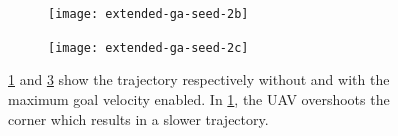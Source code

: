\begin{figure}
	\centering
	\begin{subfigure}[t]{0.30\columnwidth}
        		\texttt{[image: extended-ga-seed-2b]}
        		\caption{}
        		 \label{fig:ga-seed-nomaxvelb}
	\end{subfigure}	
	\hfill
	\begin{subfigure}[t]{0.30\columnwidth}
        		\texttt{[image: extended-ga-seed-2c]}
        		\caption{}
        		 \label{fig:ga-seed-maxvel}
	\end{subfigure}		
	\caption{ \ref{fig:ga-seed-nomaxvelb} and \ref{fig:ga-seed-maxvel} show the trajectory respectively without and with the maximum goal velocity enabled. In \ref{fig:ga-seed-nomaxvelb}, the UAV overshoots the corner which results in a slower trajectory.}
    \label{fig:ga-seed-maxvel}     
\end{figure}


